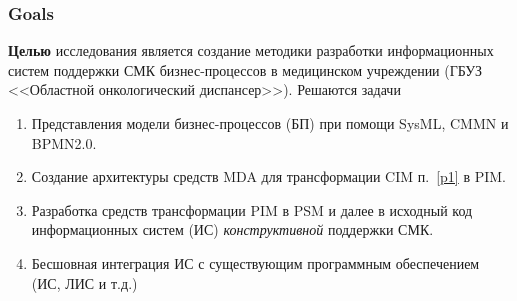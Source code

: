 \documentclass[10pt]{beamer}
\begin{document}
\begin{frame}
  \frametitle{Goals}
  \textbf{Целью} исследования является создание методики разработки информационных систем поддержки СМК бизнес-процессов в медицинском учреждении (ГБУЗ <<Областной онкологический диспансер>>). Решаются задачи
  \begin{enumerate}
  \item Представления модели бизнес-процессов (БП) при помощи SysML, CMMN и BPMN2.0. \label{p1}
  \item Создание архитектуры средств MDA для трансформации CIM п.~\ref{p1} в PIM.
  \item Разработка средств трансформации PIM в PSM и далее в исходный код информационных систем (ИС) \emph{конструктивной} поддержки СМК.
  \item Бесшовная интеграция ИС с существующим программным обеспечением (ИС, ЛИС и т.д.)
  \end{enumerate}
\end{frame}
\end{document}
